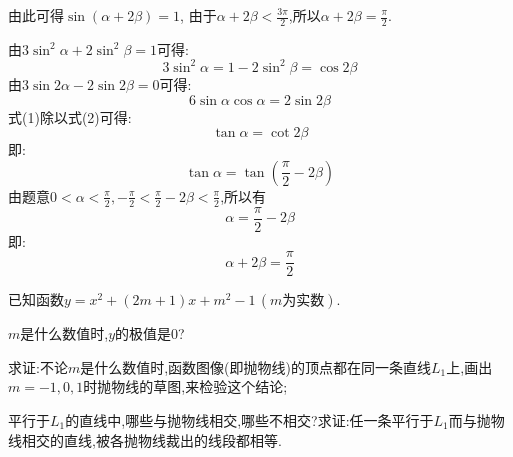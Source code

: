 \begin{questions}
\begin{proofsolution}
		由此可得$\sin(\alpha+2\beta) = 1$, 由于$\alpha + 2\beta < \frac{3\pi}{2}$,所以$\alpha+2\beta=\frac{\pi}{2}$.
	\end{proofsolution}

	\begin{proofsolution}
		{
			\color{green!50!blue}
			由$3\sin^2\alpha + 2\sin^2\beta = 1$可得:
			\begin{equation*}
				3\sin^2\alpha = 1 - 2\sin^2\beta = \cos2\beta \tag{1}
			\end{equation*}
			由$3\sin2\alpha - 2\sin2\beta=0$可得:
			\begin{equation*}
				6\sin\alpha\cos\alpha = 2\sin2\beta\tag{2}
			\end{equation*}
			式(1)除以式(2)可得:
			\begin{equation*}
				\tan\alpha = \cot2\beta
			\end{equation*}
			即:
			\begin{equation*}
				\tan\alpha = \tan(\frac{\pi}{2} - 2\beta)
			\end{equation*}
			由题意$0 < \alpha < \frac{\pi}2, -\frac{\pi}{2} < \frac{\pi}{2} - 2\beta < \frac{\pi}{2}$,所以有
			\begin{equation*}
				\alpha = \frac{\pi}{2} - 2\beta
			\end{equation*}
			即:
			\begin{equation*}
				\alpha + 2\beta = \frac{\pi}{2}
			\end{equation*}
		}
	\end{proofsolution}

	\question 已知函数$y=x^2 + (2m+1)x + m^2 - 1\, (m\text{为实数})$.
	\begin{penum}
		\item $m$是什么数值时,$y$的极值是$0$?
		\item
		      求证:不论$m$是什么数值时,函数图像(即抛物线)的顶点都在同一条直线$L_1$上,画出$m=-1,0,1$时抛物线的草图,来检验这个结论;
		\item
		      平行于$L_1$的直线中,哪些与抛物线相交,哪些不相交?求证:任一条平行于$L_1$而与抛物线相交的直线,被各抛物线裁出的线段都相等.
	\end{penum}


\end{questions}
